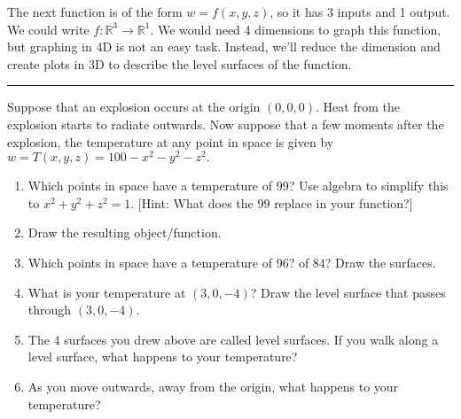 The next function is of the form $w=f(x,y,z)$, so it has 3 inputs and 1 output.  We could write $f\colon \mathbb{R}^3\to\mathbb{R}^1$. We would need 4 dimensions to graph this function, but graphing in 4D is not an easy task.  Instead, we'll reduce the dimension and create plots in 3D to describe the level surfaces of the function.

\vskip0.1in
\hrule
\vskip0.1in

\begin{problem}%
%
Suppose that an explosion occurs at the origin $(0,0,0)$. Heat from the explosion starts to radiate outwards.  Now suppose that a few moments after the explosion, the temperature at any point in space is given by $w=T(x,y,z)=100-x^2-y^2-z^2.$ 
\begin{enumerate}
 \item Which points in space have a temperature of 99? Use algebra to simplify this to $x^2+y^2+z^2=1$. [Hint: What does the 99 replace in your function?]
 \item Draw the resulting object/function.
 \item Which points in space have a temperature of 96? of 84? Draw the surfaces. 
 \item What is your temperature at $(3,0,-4)$? Draw the level surface that passes through $(3,0,-4)$.
\item The 4 surfaces you drew above are called level surfaces. If you walk along a level surface, what happens to your temperature?
 \item As you move outwards, away from the origin, what happens to your temperature?
\end{enumerate}
\end{problem}

 

